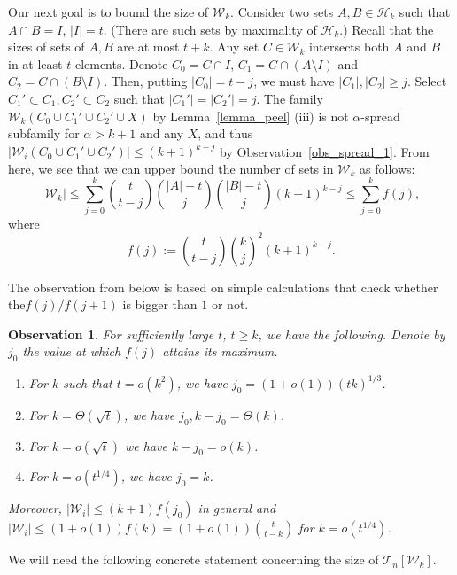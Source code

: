 \documentclass[11pt,letterpaper]{amsart}
\renewcommand{\le}{\leqslant}
\renewcommand{\ge}{\geqslant}
\newcommand{\h}{\mathcal H}
\newcommand{\T}{\mathcal{T}}
\newcommand{\W}{\mathcal{W}}
\newtheorem{observation}[theorem]{Observation}
\begin{document}
Our next goal is to bound the size of $\W_k$.
Consider two sets $A,B\in \h_k$ such that $A\cap B = I$, $|I|=t$. (There are such sets by maximality of $\h_k$.) Recall that the sizes of sets of $A,B$ are at most $t+k$.
Any set $C\in \W_k$ intersects both $A$ and $B$ in at least $t$ elements. Denote $C_0=C\cap I$, $C_1=C\cap (A\setminus I)$ and $C_2 = C\cap (B\setminus I)$. Then, putting $|C_0|=t-j$, we must have $|C_1|, |C_2|\ge j$. Select $C_1'\subset C_1,C_2'\subset C_2$ such that $|C_1'| = |C_2'| = j$. The family $\W_k(C_0\cup C_1'\cup C_2'\cup X)$ by Lemma~\ref{lemma_peel} (iii) is not  $\alpha$-spread subfamily for $\alpha>k + 1$ and any $X$, and thus $|\W_i(C_0\cup C_1'\cup C_2')|\le (k+1)^{k-j}$ by Observation~\ref{obs_spread_1}. From here, we see that we can upper bound the number of sets in $\W_k$ as follows:
$$|\W_k|\le \sum_{j=0}^{k}{t\choose t-j}{|A|-t\choose j}{|B|-t\choose j} (k+1)^{k-j}\le \sum_{j=0}^{k}f(j),$$
where
\begin{equation}\label{eqfj} f(j):= {t\choose t-j}{k\choose j}^2 (k+1)^{k-j}.\end{equation}

The observation from \cite{permutations} below is based on simple calculations that check whether the${f(j)/}{f(j+1)}$ is bigger than $1$ or not.
\begin{observation}\label{w_bounds} For sufficiently large $t$, $t\ge k$, we have the following. Denote by $j_0$ the value at which $f(j)$ attains its maximum.
  \begin{enumerate}
    \item For $k$ such that $t=o(k^2)$, we have $j_0 =(1+o(1))(tk)^{1/3}$.
    \item For $k=\Theta (\sqrt t)$, we have  $j_0,k-j_0 = \Theta (k)$.
    \item For $k = o(\sqrt t)$ we have  $k-j_0 = o(k)$.
    \item For $k = o(t^{1/4})$, we have  $j_0 = k$.
  \end{enumerate}
  Moreover, $|\W_i|\le (k+1)f(j_0)$ in general and $|\W_i|\le (1+o(1))f(k) = (1+o(1)){t\choose t-k}$ for $k = o(t^{1/4})$.
\end{observation}

We will need the following concrete statement concerning the size of $\T_n[\W_k].$
\end{document}
